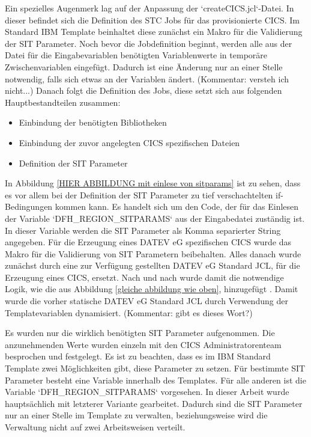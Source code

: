Ein spezielles Augenmerk lag auf der Anpassung der `createCICS.jcl`-Datei.
In dieser befindet sich die Definition des STC Jobs für das provisionierte CICS.
Im Standard IBM Template beinhaltet diese zunächst ein Makro für die Validierung der SIT Parameter.
Noch bevor die Jobdefinition beginnt, werden alle aus der Datei für die Eingabevariablen benötigten Variablenwerte in temporäre Zwischenvariablen eingefügt.
Dadurch ist eine Änderung nur an einer Stelle notwendig, falls sich etwas an der Variablen ändert. (Kommentar: versteh ich nicht...)
Danach folgt die Definition des Jobs, diese setzt sich aus folgenden Hauptbestandteilen zusammen:\\
\begin{itemize}
\item Einbindung der benötigten Bibliotheken
\item Einbindung der zuvor angelegten CICS spezifischen Dateien
\item Definition der SIT Parameter
\end{itemize}
In Abbildung \ref{HIER ABBILDUNG mit einlese von sitparams} ist zu sehen, dass es vor allem bei der Definition der SIT Parameter zu tief verschachtelten if-Bedingungen kommen kann.
Es handelt sich um den Code, der für das Einlesen der Variable `DFH\_REGION\_SITPARAMS` aus der Eingabedatei zuständig ist.
In dieser Variable werden die SIT Parameter als Komma separierter String angegeben.
Für die Erzeugung eines DATEV eG spezifischen CICS wurde das Makro für die Validierung von SIT Parametern beibehalten.
Alles danach wurde zunächst durch eine zur Verfügung gestellten DATEV eG Standard JCL, für die Erzeugung eines CICS, ersetzt.
Nach und nach wurde damit die notwendige Logik, wie die aus Abbildung \ref{gleiche abbildung wie oben}, hinzugefügt .
Damit wurde die vorher statische DATEV eG Standard JCL durch Verwendung der Templatevariablen dynamisiert. (Kommentar: gibt es dieses Wort?)

Es wurden nur die wirklich benötigten SIT Parameter aufgenommen.
Die anzunehmenden Werte wurden einzeln mit den CICS Administratorenteam besprochen und festgelegt.
Es ist zu beachten, dass es im IBM Standard Template zwei Möglichkeiten gibt, diese Parameter zu setzen.
Für bestimmte SIT Parameter besteht eine Variable innerhalb des Templates.
Für alle anderen ist die Variable `DFH\_REGION\_SITPARAMS` vorgesehen.
In dieser Arbeit wurde hauptsächlich mit letzterer Variante gearbeitet.
Dadurch sind die SIT Parameter nur an einer Stelle im Template zu verwalten, beziehungsweise wird die Verwaltung  nicht auf zwei Arbeitsweisen verteilt.

